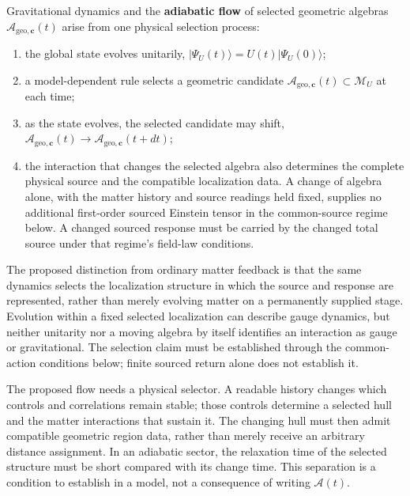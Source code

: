 \begin{conjecture}
\label{conj:main}
Gravitational dynamics and the \textbf{adiabatic flow} of selected geometric algebras $\mathcal{A}_{\mathrm{geo},\mathbf{c}}(t)$ arise from one physical selection process:
\begin{enumerate}
    \item the global state evolves unitarily, $|\Psi_U(t)\rangle = U(t)|\Psi_U(0)\rangle$;
    \item a model-dependent rule selects a geometric candidate $\mathcal{A}_{\mathrm{geo},\mathbf{c}}(t)\subset\mathcal M_U$ at each time;
    \item as the state evolves, the selected candidate may shift, $\mathcal{A}_{\mathrm{geo},\mathbf{c}}(t) \to \mathcal{A}_{\mathrm{geo},\mathbf{c}}(t + dt)$;
    \item the interaction that changes the selected algebra also determines the complete physical source and the compatible localization data. A change of algebra alone, with the matter history and source readings held fixed, supplies no additional first-order sourced Einstein tensor in the common-source regime below. A changed sourced response must be carried by the changed total source under that regime's field-law conditions.
\end{enumerate}
The proposed distinction from ordinary matter feedback is that the same dynamics selects the localization structure in which the source and response are represented, rather than merely evolving matter on a permanently supplied stage. Evolution within a fixed selected localization can describe gauge dynamics, but neither unitarity nor a moving algebra by itself identifies an interaction as gauge or gravitational. The selection claim must be established through the common-action conditions below; finite sourced return alone does not establish it.
\end{conjecture}

The proposed flow needs a physical selector. A readable history changes
which controls and correlations remain stable; those controls determine a
selected hull and the matter interactions that sustain it. The changing
hull must then admit compatible geometric region data, rather than merely
receive an arbitrary distance assignment. In an adiabatic sector, the
relaxation time of the selected structure must be short compared with its
change time. This separation is a condition to establish in a model, not
a consequence of writing $\mathcal A(t)$.

